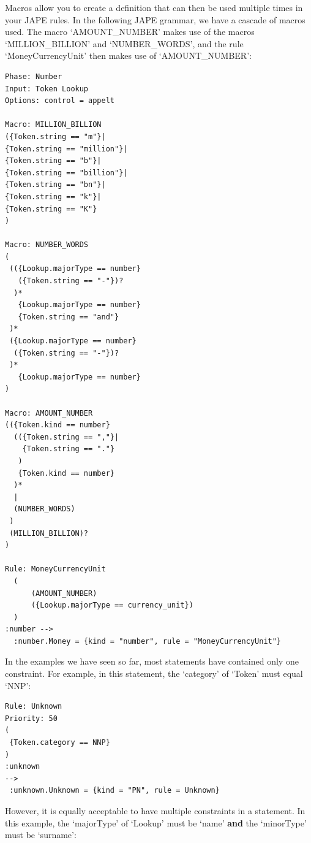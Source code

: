 Macros allow you to create a definition that can then be used multiple times in
your JAPE rules. In the following JAPE grammar, we have a cascade of macros
used. The macro `AMOUNT\_NUMBER' makes use of the macros `MILLION\_BILLION' and
`NUMBER\_WORDS', and the rule `MoneyCurrencyUnit' then makes use of
`AMOUNT\_NUMBER':

\begin{small}
\begin{verbatim}
Phase: Number
Input: Token Lookup
Options: control = appelt

Macro: MILLION_BILLION
({Token.string == "m"}|
{Token.string == "million"}|
{Token.string == "b"}|
{Token.string == "billion"}|
{Token.string == "bn"}|
{Token.string == "k"}|
{Token.string == "K"}
)

Macro: NUMBER_WORDS
(
 (({Lookup.majorType == number} 
   ({Token.string == "-"})?
  )*
   {Lookup.majorType == number}
   {Token.string == "and"}
 )*
 ({Lookup.majorType == number} 
  ({Token.string == "-"})?
 )*
   {Lookup.majorType == number}
)

Macro: AMOUNT_NUMBER
(({Token.kind == number}
  (({Token.string == ","}|
    {Token.string == "."}
   )
   {Token.kind == number}
  )*
  |
  (NUMBER_WORDS)
 )
 (MILLION_BILLION)?
)

Rule: MoneyCurrencyUnit
  (        
      (AMOUNT_NUMBER)
      ({Lookup.majorType == currency_unit})
  )
:number -->
  :number.Money = {kind = "number", rule = "MoneyCurrencyUnit"}
\end{verbatim}
\end{small}


In the examples we have seen so far, most statements have contained only one
constraint. For example, in this statement, the `category' of `Token' must
equal `NNP':

\begin{small}
\begin{verbatim}
Rule: Unknown
Priority: 50
( 
 {Token.category == NNP}
) 
:unknown
-->
 :unknown.Unknown = {kind = "PN", rule = Unknown}
\end{verbatim}
\end{small}

However, it is equally acceptable to have multiple constraints in a statement.
In this example, the `majorType' of `Lookup' must be `name' {\bf and} the
`minorType' must be `surname':

